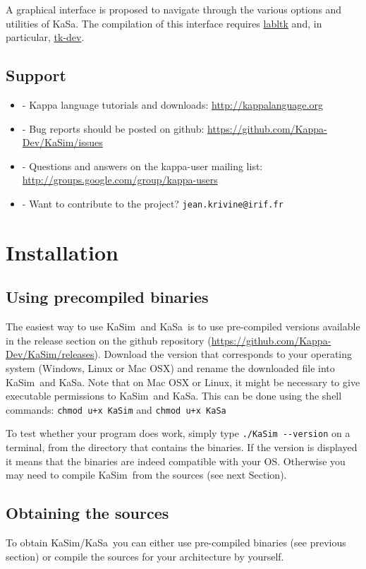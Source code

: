 \documentclass[11pt]{book}
\def\KaSim{\textsf{KaSim}}
\def\KaSa{\textsf{KaSa}}
\def\ttt#1{\texttt{#1}}
\def\ITE#1{\begin{itemize}#1\end{itemize}}
\def\dd{-\hspace{0.001cm}-}
\begin{document}
A graphical interface is proposed to navigate through the various options and utilities  of \KaSa. The compilation of this interface requires \href{https://forge.ocamlcore.org/projects/labltk/}{labltk} and, in particular,  \href{http://www.tcl.tk/}{tk-dev}.


\section{Support}
\ITE{
\item[-] Kappa language tutorials and downloads: \url{http://kappalanguage.org}
\item[-] Bug reports should be posted on github: \url{https://github.com/Kappa-Dev/KaSim/issues}
\item[-] Questions and answers on the kappa-user mailing list: \url{http://groups.google.com/group/kappa-users}
\item[-] Want to contribute to the project? \ttt{jean.krivine@irif.fr}
}

\chapter{Installation}\label{chap:install}

\section{Using precompiled binaries}
The easiest way to use \KaSim~and \KaSa~is to use pre-compiled versions available in the release section on the github repository (\url{https://github.com/Kappa-Dev/KaSim/releases}). Download the version that corresponds to your operating system (Windows, Linux or Mac OSX) and rename the downloaded file into \KaSim~and \KaSa. Note that on Mac OSX or Linux, it might be necessary to give executable permissions to \KaSim~and \KaSa. This can be done using the shell commands:
\ttt{chmod u+x KaSim} and \ttt{chmod u+x KaSa}

To test whether your program does work, simply type \ttt{./KaSim \dd version} on a terminal, from the directory that contains the binaries. If the version is displayed it means that the binaries are indeed compatible with your OS. Otherwise you may need to compile \KaSim~from the sources (see next Section).

\section{Obtaining the sources}\label{sec:sources}
To obtain \KaSim/\KaSa~you can either use pre-compiled binaries (see
previous section) or compile the sources for your
architecture by yourself.
\end{document}
